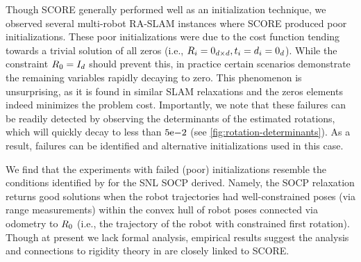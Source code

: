 \ScoreDeterminantPlot

Though SCORE generally performed well as an initialization technique, we
observed several multi-robot RA-SLAM instances where SCORE produced poor
initializations. These poor initializations were due to the cost function
tending towards a trivial solution of all zeros (i.e., $R_i = 0_{d \times d},
t_i = d_i = 0_{d}$). While the constraint $R_0 = I_{d}$ should
prevent this, in practice certain scenarios demonstrate the
remaining variables rapidly decaying to zero. This phenomenon is unsurprising,
as it is found in similar SLAM relaxations \cite{Rosen15icra,carlone15icra} and
the zeros elements indeed minimizes the problem cost. Importantly, we
note that these failures can be readily detected by observing the determinants
of the estimated rotations, which will quickly decay to less than
${5}\mathrm{e}{-2}$ (see \cref{fig:rotation-determinants}).
As a result, failures can be identified and alternative initializations used in
this case.

We find that the experiments with failed (poor) initializations resemble the
conditions identified by \cite{tseng07siam} for the SNL SOCP derived.  Namely,
the SOCP relaxation returns good solutions when the robot trajectories had
well-constrained poses (via range measurements) within the convex hull of robot
poses connected via odometry to $R_0$ (i.e., the trajectory of the robot with
constrained first rotation). Though at present we lack formal analysis,
empirical results suggest the analysis and connections to rigidity theory in
\cite{tseng07siam} are closely linked to SCORE.
